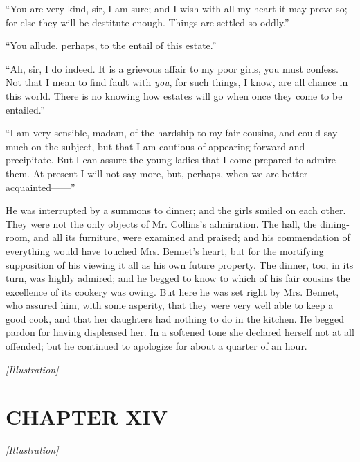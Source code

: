 \documentclass[12pt]{book}
\begin{document}
``You are very kind, sir, I am sure; and I wish with all my heart it may prove so; for else they will be destitute enough. Things are settled so oddly.''

``You allude, perhaps, to the entail of this estate.''

``Ah, sir, I do indeed. It is a grievous affair to my poor girls, you must confess. Not that I mean to find fault with \textit{you}, for such things, I know, are all chance in this world. There is no knowing how estates will go when once they come to be entailed.''

``I am very sensible, madam, of the hardship to my fair cousins, and could say much on the subject, but that I am cautious of appearing forward and precipitate. But I can assure the young ladies that I come prepared to admire them. At present I will not say more, but, perhaps, when we are better acquainted------''

He was interrupted by a summons to dinner; and the girls smiled on each other. They were not the only objects of Mr. Collins's admiration. The hall, the dining-room, and all its furniture, were examined and praised; and his commendation of everything would have touched Mrs. Bennet's heart, but for the mortifying supposition of his viewing it all as his own future property. The dinner, too, in its turn, was highly admired; and he begged to know to which of his fair cousins the excellence of its cookery was owing. But here he was set right by Mrs. Bennet, who assured him, with some asperity, that they were very well able to keep a good cook, and that her daughters had nothing to do in the kitchen. He begged pardon for having displeased her. In a softened tone she declared herself not at all offended; but he continued to apologize for about a quarter of an hour.

\emph{[Illustration]}

\chapter{CHAPTER XIV}

\emph{[Illustration]}
\end{document}
